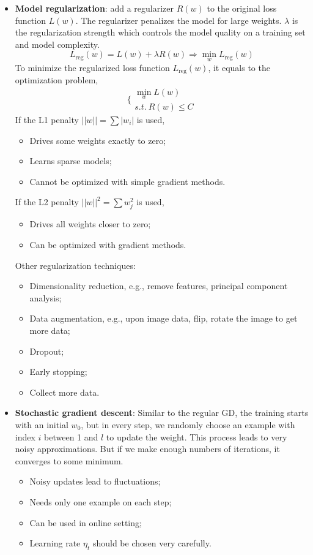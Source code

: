\documentclass[]{article}
\begin{document}
\begin{itemize}
\begin{itemize}
		\item \textbf{Model regularization}: add a regularizer $R(w)$ to the original loss function $L(w)$. The regularizer penalizes the model for large weights. $\lambda$ is the regularization strength which controls the model quality on a training set and model complexity.
		\begin{equation}
		L_{\mathrm{reg}}(w)=L(w)+\lambda R(w)\Rightarrow \min_{w}{L_{\mathrm{reg}}(w)}
		\end{equation}
		To minimize the regularized loss function $L_{\mathrm{reg}}(w)$, it equals to the optimization problem,
		\begin{equation}
		\{
		\begin{array}{c}
		\min_{w}{L(w)} \\
		s.t.\ R(w) \leq C
		\end{array}
		\end{equation}
		If the L1 penalty $||w||=\sum{|w_i|}$ is used,
		\begin{itemize}
			\item Drives some weights exactly to zero;
			\item Learns sparse models;
			\item Cannot be optimized with simple gradient methods.
		\end{itemize}
		If the L2 penalty $||w||^2=\sum{w_j^2}$ is used,
		\begin{itemize}
			\item Drives all weights closer to zero;
			\item Can be optimized with gradient methods.
		\end{itemize}
		Other regularization techniques:
		\begin{itemize}
			\item Dimensionality reduction, e.g., remove features, principal component analysis;
			\item Data augmentation, e.g., upon image data, flip, rotate the image to get more data;
			\item Dropout;
			\item Early stopping;
			\item Collect more data.
		\end{itemize}
		
		\item \textbf{Stochastic gradient descent}: Similar to the regular GD, the training starts with an initial $w_0$, but in every step, we randomly choose an example with index $i$ between 1 and $l$ to update the weight. This process leads to very noisy approximations. But if we make enough numbers of iterations, it converges to some minimum.
		\begin{itemize}
			\item Noisy updates lead to fluctuations;
			\item Needs only one example on each step;
			\item Can be used in online setting;
			\item Learning rate $\eta_t$ should be chosen very carefully.
		\end{itemize}
		

\end{itemize}
\end{itemize}
\end{document}
